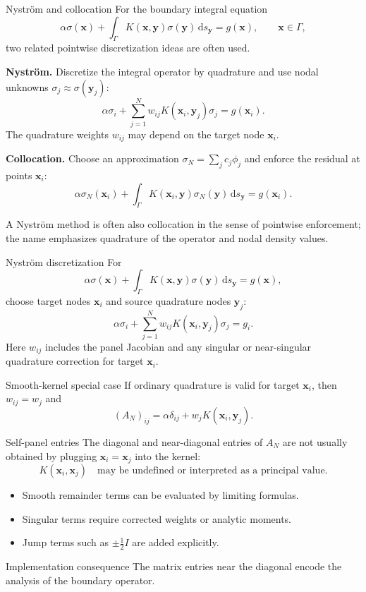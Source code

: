 \documentclass[aspectratio=169,11pt]{beamer}
\newcommand{\dd}{\,\mathrm d}
\newcommand{\x}{\bm{x}}
\newcommand{\y}{\bm{y}}
\begin{document}
\begin{frame}{Nystr\"om and collocation}
\small
For the boundary integral equation
\[
  \alpha\sigma(\x)+\int_\Gamma K(\x,\y)\sigma(\y)\dd s_{\y}=g(\x),
  \qquad \x\in\Gamma,
\]
two related pointwise discretization ideas are often used.

\textbf{Nystr\"om.}
Discretize the integral operator by quadrature and use nodal unknowns
$\sigma_j\approx\sigma(\y_j)$:
\[
  \alpha\sigma_i+\sum_{j=1}^{N}w_{ij}K(\x_i,\y_j)\sigma_j=g(\x_i).
\]
The quadrature weights $w_{ij}$ may depend on the target node $\x_i$.

\vspace{1mm}
\textbf{Collocation.}
Choose an approximation $\sigma_N=\sum_j c_j\phi_j$ and enforce the residual
at points $\x_i$:
\[
  \alpha\sigma_N(\x_i)+\int_\Gamma K(\x_i,\y)\sigma_N(\y)\dd s_{\y}=g(\x_i).
\]

\vspace{1mm}
A Nystr\"om method is often also collocation in the sense of pointwise
enforcement; the name emphasizes quadrature of the operator and nodal density
values.
\end{frame}

\begin{frame}{Nystr\"om discretization}
\small
For
\[
  \alpha\sigma(\x)+\int_{\Gamma}K(\x,\y)\sigma(\y)\dd s_{\y}=g(\x),
\]
choose target nodes $\x_i$ and source quadrature nodes $\y_j$:
\[
  \alpha\sigma_i+\sum_{j=1}^{N}w_{ij}K(\x_i,\y_j)\sigma_j=g_i.
\]
Here $w_{ij}$ includes the panel Jacobian and any singular or near-singular
quadrature correction for target $\x_i$.

\begin{block}{Smooth-kernel special case}
If ordinary quadrature is valid for target $\x_i$, then $w_{ij}=w_j$ and
\[
  (A_N)_{ij}=\alpha\delta_{ij}+w_jK(\x_i,\y_j).
\]
\end{block}
\end{frame}

\begin{frame}{Self-panel entries}
\small
The diagonal and near-diagonal entries of $A_N$ are not usually obtained by
plugging $\x_i=\x_j$ into the kernel:
\[
K(\x_i,\x_j)\quad\text{may be undefined or interpreted as a principal value.}
\]

\begin{itemize}
  \item Smooth remainder terms can be evaluated by limiting formulas.
  \item Singular terms require corrected weights or analytic moments.
  \item Jump terms such as $\pm\frac12 I$ are added explicitly.
\end{itemize}

\begin{block}{Implementation consequence}
The matrix entries near the diagonal encode the analysis of the boundary
operator.
\end{block}
\end{frame}
\end{document}
